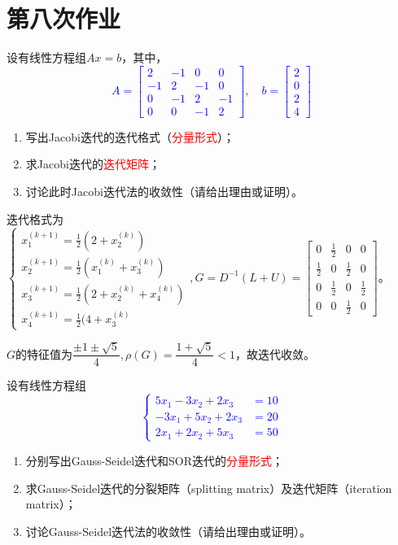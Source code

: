 \chapter{第八次作业}

    \begin{homework}[10pts]
        设有线性方程组$Ax=b$，其中，\textcolor{blue}{\[A=\begin{bmatrix}2&-1&0&0\\-1&2&-1&0\\0&-1&2&-1\\0&0&-1& 2\end{bmatrix},\quad b=\begin{bmatrix}2\\0\\2\\4\end{bmatrix}\]}
        \begin{enumerate}
            \item 写出Jacobi迭代的迭代格式（\textcolor{red}{分量形式}）；
            \item 求Jacobi迭代的\textcolor{red}{迭代矩阵}；
            \item 讨论此时Jacobi迭代法的收敛性（请给出理由或证明）。
        \end{enumerate}
    \end{homework}

    \begin{solution}
        迭代格式为$\begin{cases}x_1^{(k+1)}=\frac12(2+x_2^{(k)})\\x_2^{(k+1)}=\frac12(x_1^{(k)}+x_3^{(k)})\\x_3^{(k+1)}=\frac12(2+x_2^{(k)}+x_4^{(k)})\\x_4^{(k+1)}=\frac12(4+x_3^{(k)}\end{cases},G=D^{-1}(L+U)=\begin{bmatrix}0&\frac12&0&0\\\frac12&0 &\frac12&0 \\0&\frac12&0&\frac12\\0&0&\frac12& 0\end{bmatrix}$。

        $G$的特征值为$\dfrac{\pm 1\pm\sqrt{5}}{4},\rho(G)=\dfrac{1+\sqrt{5}}4<1$，故迭代收敛。
    \end{solution}

    \begin{homework}[10pts]
        设有线性方程组\textcolor{blue}{\[\begin{cases}5x_1-3x_2+2x_3&=10\\-3x_1+5x_2+2x_3&=20\\2x_1+2x_2+5x_3&=50\end{cases}\]}
        \begin{enumerate}
            \item 分别写出Gauss-Seidel迭代和SOR迭代的\textcolor{red}{分量形式}；
            \item 求Gauss-Seidel迭代的分裂矩阵（splitting matrix）及迭代矩阵（iteration matrix）；
            \item 讨论Gauss-Seidel迭代法的收敛性（请给出理由或证明）。
        \end{enumerate}
    \end{homework}

